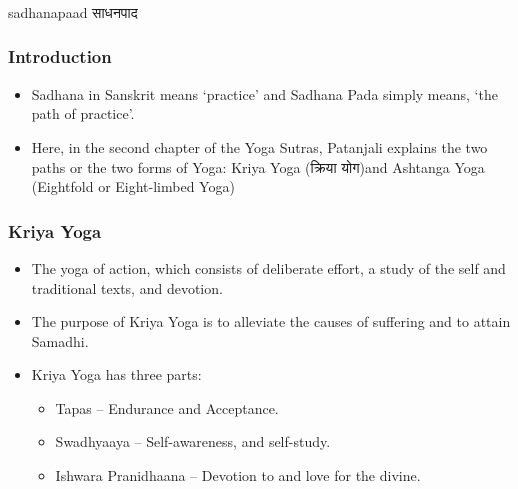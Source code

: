 \begin{frame}[fragile]\frametitle{}
\begin{center}
{\Large sadhanapaad साधनपाद}
\end{center}
\end{frame}


\begin{frame}[fragile]\frametitle{Introduction}


	\begin{itemize}
	\item Sadhana in Sanskrit means `practice' and Sadhana Pada simply means, `the path of practice'. 	
	\item Here, in the second chapter of the Yoga Sutras, Patanjali explains the two paths or the two forms of Yoga: Kriya Yoga (क्रिया योग)and Ashtanga Yoga (Eightfold or Eight-limbed Yoga)
	\end{itemize}

\end{frame}

\begin{frame}[fragile]\frametitle{Kriya Yoga}


	\begin{itemize}
	\item The yoga of action, which consists of deliberate effort, a study of the self and traditional texts, and devotion. 
	\item The purpose of Kriya Yoga is to alleviate the causes of suffering and to attain Samadhi. 
	\item Kriya Yoga has three parts:
		\begin{itemize}
		\item Tapas – Endurance and Acceptance.
		\item Swadhyaaya – Self-awareness, and self-study.
		\item Ishwara Pranidhaana – Devotion to and love for the divine.
		\end{itemize}	
	\end{itemize}

\end{frame}

